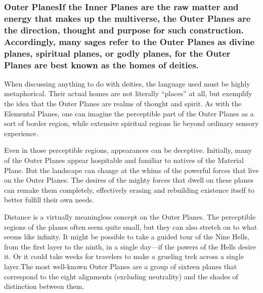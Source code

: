 \documentclass[
]{article}
\begin{document}
\hypertarget{outer-planesif-the-inner-planes-are-the-raw-matter-and-energy-that-makes-up-the-multiverse-the-outer-planes-are-the-direction-thought-and-purpose-for-such-construction-accordingly-many-sages-refer-to-the-outer-planes-as-divine-planes-spiritual-planes-or-godly-planes-for-the-outer-planes-are-best-known-as-the-homes-of-deities}{%
\subsubsection{Outer PlanesIf the Inner Planes are the raw matter and
energy that makes up the multiverse, the Outer Planes are the direction,
thought and purpose for such construction. Accordingly, many sages refer
to the Outer Planes as divine planes, spiritual planes, or godly planes,
for the Outer Planes are best known as the homes of
deities.}\label{outer-planesif-the-inner-planes-are-the-raw-matter-and-energy-that-makes-up-the-multiverse-the-outer-planes-are-the-direction-thought-and-purpose-for-such-construction-accordingly-many-sages-refer-to-the-outer-planes-as-divine-planes-spiritual-planes-or-godly-planes-for-the-outer-planes-are-best-known-as-the-homes-of-deities}}

When discussing anything to do with deities, the language used must be
highly metaphorical. Their actual homes are not literally ``places'' at
all, but exemplify the idea that the Outer Planes are realms of thought
and spirit. As with the Elemental Planes, one can imagine the
perceptible part of the Outer Planes as a sort of border region, while
extensive spiritual regions lie beyond ordinary sensory experience.

Even in those perceptible regions, appearances can be deceptive.
Initially, many of the Outer Planes appear hospitable and familiar to
natives of the Material Plane. But the landscape can change at the whims
of the powerful forces that live on the Outer Planes. The desires of the
mighty forces that dwell on these planes can remake them completely,
effectively erasing and rebuilding existence itself to better fulfill
their own needs.

Distance is a virtually meaningless concept on the Outer Planes. The
perceptible regions of the planes often seem quite small, but they can
also stretch on to what seems like infinity. It might be possible to
take a guided tour of the Nine Hells, from the first layer to the ninth,
in a single day---if the powers of the Hells desire it. Or it could take
weeks for travelers to make a grueling trek across a single layer.The
most well-known Outer Planes are a group of sixteen planes that
correspond to the eight alignments (excluding neutrality) and the shades
of distinction between them.
\end{document}
